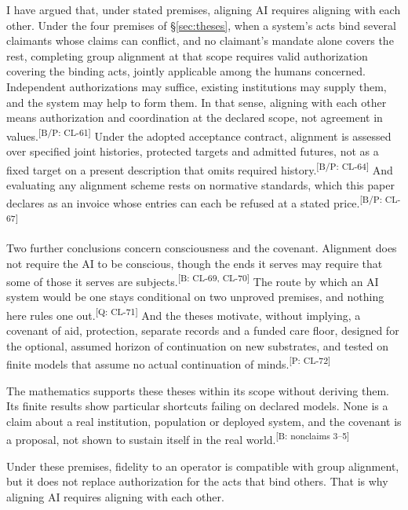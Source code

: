 \documentclass[pdflatex,sn-basic]{sn-jnl}%
\providecommand{\backmatter}{}
\newcommand{\slot}[1]{}%
\newcommand{\claim}[2]{\ifannotated\textsuperscript{\textcolor{blue!60!black}{\tiny[#1: #2]}}\fi}
\begin{document}
\slot{11.1}
I have argued that, under stated premises, aligning AI requires aligning with each other. Under the four premises of \S\ref{sec:theses}, when a system's acts bind several claimants whose claims can conflict, and no claimant's mandate alone covers the rest, completing group alignment at that scope requires valid authorization covering the binding acts, jointly applicable among the humans concerned. Independent authorizations may suffice, existing institutions may supply them, and the system may help to form them. In that sense, aligning with each other means authorization and coordination at the declared scope, not agreement in values.\claim{B/P}{CL-61} Under the adopted acceptance contract, alignment is assessed over specified joint histories, protected targets and admitted futures, not as a fixed target on a present description that omits required history.\claim{B/P}{CL-64} And evaluating any alignment scheme rests on normative standards, which this paper declares as an invoice whose entries can each be refused at a stated price.\claim{B/P}{CL-67}

Two further conclusions concern consciousness and the covenant. Alignment does not require the AI to be conscious, though the ends it serves may require that some of those it serves are subjects.\claim{B}{CL-69, CL-70} The route by which an AI system would be one stays conditional on two unproved premises, and nothing here rules one out.\claim{Q}{CL-71} And the theses motivate, without implying, a covenant of aid, protection, separate records and a funded care floor, designed for the optional, assumed horizon of continuation on new substrates, and tested on finite models that assume no actual continuation of minds.\claim{P}{CL-72}

The mathematics supports these theses within its scope without deriving them. Its finite results show particular shortcuts failing on declared models. None is a claim about a real institution, population or deployed system, and the covenant is a proposal, not shown to sustain itself in the real world.\claim{B}{nonclaims 3--5}

Under these premises, fidelity to an operator is compatible with group alignment, but it does not replace authorization for the acts that bind others. That is why aligning AI requires aligning with each other.

\backmatter
\end{document}
